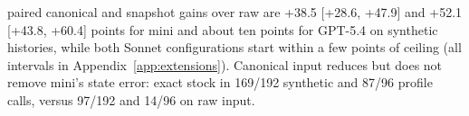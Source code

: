 paired canonical and snapshot gains over raw are +38.5 [+28.6, +47.9] and +52.1 [+43.8, +60.4] points for mini and about ten points for GPT-5.4 on synthetic histories, while both Sonnet configurations start within a few points of ceiling (all intervals in Appendix~\ref{app:extensions}). Canonical input reduces but does not remove mini's state error: exact stock in 169/192 synthetic and 87/96 profile calls, versus 97/192 and 14/96 on raw input.
